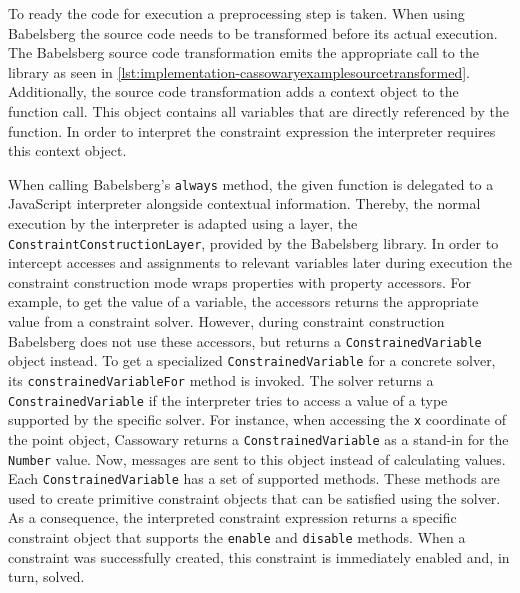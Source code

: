 To ready the code for execution a preprocessing step is taken.
When using Babelsberg the source code needs to be transformed before its actual execution. The Babelsberg source code transformation emits the appropriate call to the library as seen in \autoref{lst:implementation-cassowaryexamplesourcetransformed}.
Additionally, the source code transformation adds a context object to the function call. This object contains all variables that are directly referenced by the function.
In order to interpret the constraint expression the interpreter requires this context object.

When calling Babelsberg's \texttt{always} method, the given function is delegated to a JavaScript interpreter alongside contextual information.
Thereby, the normal execution by the interpreter is adapted using a layer, the \texttt{ConstraintConstructionLayer}, provided by the Babelsberg library.
In order to intercept accesses and assignments to relevant variables later during execution the constraint construction mode wraps properties with property accessors. For example, to get the value of a variable, the accessors returns the appropriate value from a constraint solver.
However, during constraint construction Babelsberg does not use these accessors, but returns a \texttt{ConstrainedVariable} object instead. To get a specialized \texttt{ConstrainedVariable} for a concrete solver, its \texttt{constrainedVariableFor} method is invoked. The solver returns a \texttt{ConstrainedVariable} if the interpreter tries to access a value of a type supported by the specific solver. For instance, when accessing the \texttt{x} coordinate of the point object, Cassowary returns a \texttt{ConstrainedVariable} as a stand-in for the \texttt{Number} value.
Now, messages are sent to this object instead of calculating values.
Each \texttt{ConstrainedVariable} has a set of supported methods. These methods are used to create primitive constraint objects that can be satisfied using the solver.
As a consequence, the interpreted constraint expression returns a specific constraint object that supports the \texttt{enable} and \texttt{disable} methods.
When a constraint was successfully created, this constraint is immediately enabled and, in turn, solved.

